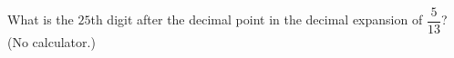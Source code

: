 What is the $25$th digit after the decimal point in the decimal expansion of $\dfrac{5}{13}$? (No calculator.)
